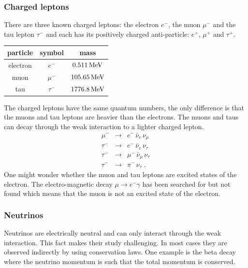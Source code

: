 \documentclass[12pt]{article}
\begin{document}
\subsubsection{Charged leptons}
There are three known charged leptons: the electron $e^-$, the muon $\mu^-$ and the tau lepton $\tau^-$ and each has its positively charged anti-particle: $e^+$, $\mu^+$ and $\tau^+$. 
\begin{center}
\begin{tabular}{c|c|c}
particle &  symbol & mass \\
\hline
\hline
electron  & $e^-$ & $0.511\,{\rm MeV}$ \\
\hline
muon  & $\mu^-$ &  $105.65\,{\rm MeV}$ \\
\hline
 tau     & $\tau^-$ & $1776.8\,{\rm MeV}$
\end{tabular}   
\end{center}
The charged leptons have the same quantum numbers, the only difference is that the muons and tau leptons are heavier than the electrons. The muons and taus can decay through the weak interaction to a lighter charged lepton.
\begin{eqnarray*}
\mu^-&\rightarrow&e^-\,\bar \nu_e \, \nu_\mu\\
\tau^-&\rightarrow&e^-\,\bar \nu_e \, \nu_\tau\\
\tau^-&\rightarrow&\mu^-\,\bar \nu_\mu \, \nu_\tau\\
\tau^-&\rightarrow& \pi^-\, \nu_\tau\;.
\end{eqnarray*}
One might wonder whether the muon and tau leptons are excited states of the electron. The electro-magnetic decay $\mu\rightarrow e^- \gamma$ has been searched for but not found which means that the muon is not an excited state of the electron.
\subsubsection{Neutrinos}
Neutrinos are electrically neutral and can only interact through the weak interaction. This fact makes their study challenging. In most cases they are observed indirectly by using conservation laws. One example is the beta decay where the neutrino momentum is such that the total momentum is conserved.
\end{document}
